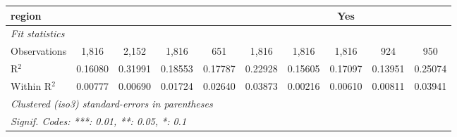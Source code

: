 \begin{tabular}{lccccccccc}
   region                     &          &          &           &              &            &            & Yes          &           & \\  
   \midrule
   \emph{Fit statistics}\\
   Observations               & 1,816    & 2,152    & 1,816     & 651          & 1,816      & 1,816      & 1,816        & 924       & 950\\  
   R$^2$                      & 0.16080  & 0.31991  & 0.18553   & 0.17787      & 0.22928    & 0.15605    & 0.17097      & 0.13951   & 0.25074\\  
   Within R$^2$               & 0.00777  & 0.00690  & 0.01724   & 0.02640      & 0.03873    & 0.00216    & 0.00610      & 0.00811   & 0.03941\\  
   \midrule \midrule
   \multicolumn{10}{l}{\emph{Clustered (iso3) standard-errors in parentheses}}\\
   \multicolumn{10}{l}{\emph{Signif. Codes: ***: 0.01, **: 0.05, *: 0.1}}\\
\end{tabular}
\par\endgroup


